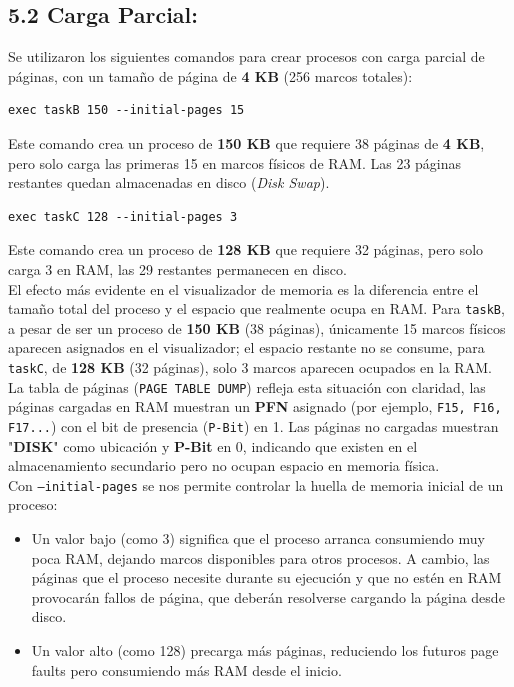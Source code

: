\documentclass[12pt,letterpaper]{article}
\begin{document}
\subsection*{5.2 Carga Parcial:}
Se utilizaron los siguientes comandos para crear procesos con carga parcial de páginas, con un tamaño de página
de \textbf{4 KB} (256 marcos totales):
\begin{Verbatim}[formatcom=\color{greencolor}]
exec taskB 150 --initial-pages 15
\end{Verbatim}

Este comando crea un proceso de \textbf{150 KB} que requiere 38 páginas de \textbf{4 KB}, pero solo carga las
primeras 15 en marcos físicos de RAM. Las 23 páginas restantes quedan almacenadas en disco (\textit{Disk Swap}).
\begin{Verbatim}[formatcom=\color{greencolor}]
exec taskC 128 --initial-pages 3
\end{Verbatim}

Este comando crea un proceso de \textbf{128 KB} que requiere 32 páginas, pero solo carga 3 en RAM, las 29
restantes permanecen en disco.\\

El efecto más evidente en el visualizador de memoria es la diferencia entre el tamaño total del proceso y el
espacio que realmente ocupa en RAM. Para \texttt{taskB}, a pesar de ser un proceso de \textbf{150 KB}
(38 páginas), únicamente 15 marcos físicos aparecen asignados en el visualizador; el espacio restante no se
consume, para \texttt{taskC}, de \textbf{128 KB} (32 páginas), solo 3 marcos aparecen ocupados en la RAM.\\

La tabla de páginas (\texttt{PAGE TABLE DUMP}) refleja esta situación con claridad, las páginas cargadas en RAM
muestran un \textbf{PFN} asignado (por ejemplo, \texttt{F15, F16, F17...}) con el bit de presencia
(\texttt{P-Bit}) en 1. Las páginas no cargadas muestran "\textbf{DISK}" como ubicación y \textbf{P-Bit} en 0,
indicando que existen en el almacenamiento secundario pero no ocupan espacio en memoria física.\\

Con \texttt{--initial-pages} se nos permite controlar la huella de memoria inicial de un proceso:
\begin{itemize}
\item Un valor bajo (como 3) significa que el proceso arranca consumiendo muy poca RAM, dejando marcos
  disponibles para otros procesos. A cambio, las páginas que el proceso necesite durante su ejecución y que no
  estén en RAM provocarán fallos de página, que deberán resolverse cargando la página desde disco.
\item Un valor alto (como 128) precarga más páginas, reduciendo los futuros page faults pero consumiendo más RAM
  desde el inicio.
\end{itemize}
\end{document}
